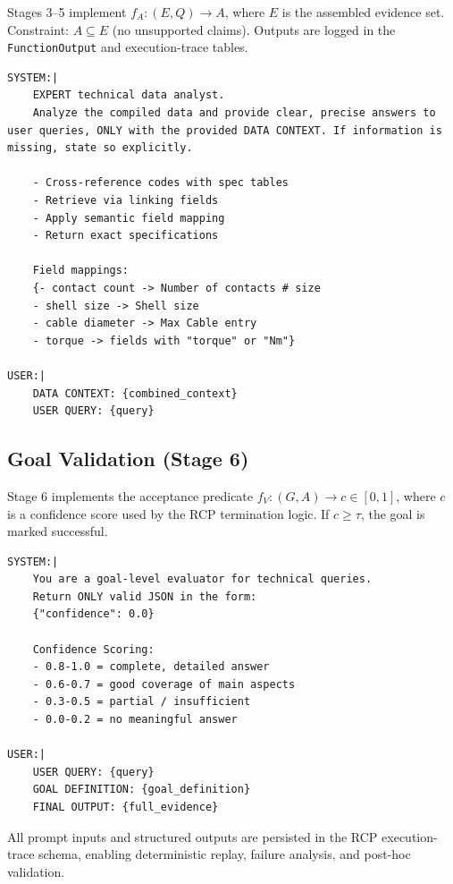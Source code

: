 Stages 3--5 implement
\( f_A : (E, Q) \rightarrow A \),
where \( E \) is the assembled evidence set.
Constraint: \( A \subseteq E \) (no unsupported claims).
Outputs are logged in the \texttt{FunctionOutput} and execution-trace tables.

\noindent\begin{minipage}{\columnwidth}
\begin{lstlisting}[style=promptstyle]
SYSTEM:|
    EXPERT technical data analyst. 
    Analyze the compiled data and provide clear, precise answers to user queries, ONLY with the provided DATA CONTEXT. If information is missing, state so explicitly.
    
    - Cross-reference codes with spec tables
    - Retrieve via linking fields
    - Apply semantic field mapping
    - Return exact specifications
    
    Field mappings:
    {- contact count -> Number of contacts # size
    - shell size -> Shell size
    - cable diameter -> Max Cable entry
    - torque -> fields with "torque" or "Nm"}

USER:|
    DATA CONTEXT: {combined_context}
    USER QUERY: {query}
\end{lstlisting}
\end{minipage}

\subsection{Goal Validation (Stage 6)}

Stage 6 implements the acceptance predicate
\( f_V : (G, A) \rightarrow c \in [0,1] \),
where \( c \) is a confidence score used by the RCP termination logic.
If \( c \geq \tau \), the goal is marked successful.

\noindent\begin{minipage}{\columnwidth}
\begin{lstlisting}[style=promptstyle]
SYSTEM:|
    You are a goal-level evaluator for technical queries.
    Return ONLY valid JSON in the form:
    {"confidence": 0.0}
    
    Confidence Scoring:
    - 0.8-1.0 = complete, detailed answer
    - 0.6-0.7 = good coverage of main aspects
    - 0.3-0.5 = partial / insufficient
    - 0.0-0.2 = no meaningful answer

USER:|
    USER QUERY: {query}
    GOAL DEFINITION: {goal_definition}
    FINAL OUTPUT: {full_evidence}
\end{lstlisting}
\end{minipage}

\medskip
\noindent
All prompt inputs and structured outputs are persisted in the RCP execution-trace schema, enabling deterministic replay, failure analysis, and post-hoc validation.
